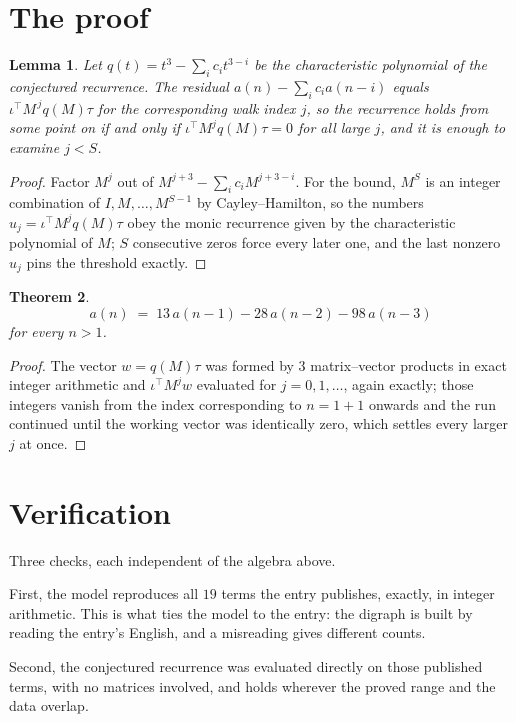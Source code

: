 \documentclass[11pt,a4paper]{article}
\theoremstyle{plain}
\newtheorem{theorem}{Theorem}
\newtheorem{lemma}[theorem]{Lemma}
\theoremstyle{definition}
\begin{document}
\section{The proof}

\begin{lemma}\label{lem:crit}
Let $q(t)=t^{3}-\sum_i c_it^{3-i}$ be the characteristic polynomial of the
conjectured recurrence. The residual $a(n)-\sum_ic_ia(n-i)$ equals
$\iota^{\!\top}M^{\,j}q(M)\tau$ for the corresponding walk index $j$, so the recurrence
holds from some point on if and only if $\iota^{\!\top}M^{j}q(M)\tau=0$ for all large $j$,
and it is enough to examine $j<S$.
\end{lemma}

\begin{proof}
Factor $M^{j}$ out of $M^{j+3}-\sum_ic_iM^{j+3-i}$. For the bound, $M^{S}$
is an integer combination of $I,M,\dots,M^{S-1}$ by Cayley--Hamilton, so the numbers
$u_j=\iota^{\!\top}M^{j}q(M)\tau$ obey the monic recurrence given by the characteristic
polynomial of $M$; $S$ consecutive zeros force every later one, and the last nonzero $u_j$
pins the threshold exactly.
\end{proof}

\begin{theorem}
\[
a(n)\;=\;13\,a(n-1) - 28\,a(n-2) - 98\,a(n-3)
\]
for every $n>1$.
\end{theorem}

\begin{proof}
The vector $w=q(M)\tau$ was formed by $3$ matrix--vector products in exact integer
arithmetic and $\iota^{\!\top}M^{j}w$ evaluated for $j=0,1,\dots$, again exactly; those
integers vanish from the index corresponding to $n=1+1$ onwards and the run continued
until the working vector was identically zero, which settles every larger $j$ at once.
\end{proof}

\section{Verification}

Three checks, each independent of the algebra above.

First, the model reproduces all $19$ terms the entry publishes, exactly, in integer
arithmetic. This is what ties the model to the entry: the digraph is built by reading the
entry's English, and a misreading gives different counts.

Second, the conjectured recurrence was evaluated directly on those published terms, with no
matrices involved, and holds wherever the proved range and the data overlap.
\end{document}
